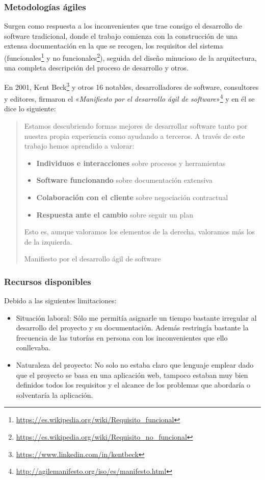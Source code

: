 \subsubsection{Metodologías ágiles}

Surgen como respuesta a los inconvenientes que trae consigo el desarrollo de software tradicional, donde el trabajo comienza con la construcción de una extensa documentación en la que se recogen, los requisitos del sistema (funcionales\footnote{\url{https://es.wikipedia.org/wiki/Requisito_funcional}} y no funcionales\footnote{\url{https://es.wikipedia.org/wiki/Requisito_no_funcional}}), seguida del diseño minucioso de la arquitectura, una completa descripción del proceso de desarrollo y otros. 

En 2001, Kent Beck\footnote{\url{https://www.linkedin.com/in/kentbeck}} y otros 16 notables, desarrolladores de software, consultores y editores, firmaron el «\textit{Manifiesto por el desarrollo ágil de software}»\footnote{\url{http://agilemanifesto.org/iso/es/manifesto.html}} y en él se dice lo siguiente:

\begin{quote}
{\itshape

Estamos descubriendo formas mejores de desarrollar software tanto por nuestra propia experiencia como ayudando a terceros. A través de este trabajo hemos
aprendido a valorar:
\begin{itemize}
\item\textbf{Individuos e interacciones} sobre procesos y herramientas
\item \textbf{Software funcionando} sobre documentación extensiva
\item \textbf{Colaboración con el cliente} sobre negociación contractual
\item \textbf{Respuesta ante el cambio} sobre seguir un plan
\end{itemize}

Esto es, aunque valoramos los elementos de la derecha, valoramos más los de la izquierda.
}
\par\nointerlineskip\noindent\hfill Manifiesto por el desarrollo ágil de software~\cite{AgileManifest}
\end{quote}

\subsubsection{Recursos disponibles}
Debido a las siguientes limitaciones:

\begin{itemize}
\item Situación laboral: Sólo me permitía asignarle un tiempo bastante irregular al desarrollo del proyecto y su documentación. Además restringía bastante la frecuencia de las tutorías en persona con los inconvenientes que ello conllevaba.
\item Naturaleza del proyecto: No solo no estaba claro que lenguaje emplear dado que el proyecto se basa en una aplicación web, tampoco estaban muy bien definidos todos los requisitos y el alcance de los problemas que abordaría o solventaría la aplicación.
\end{itemize}

